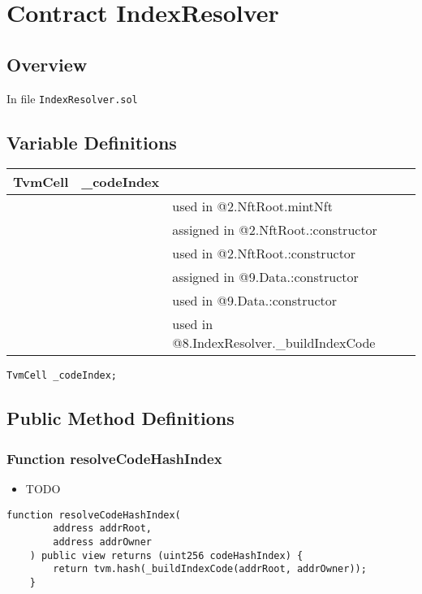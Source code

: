 
\chapter{Contract IndexResolver}

\minitoc

\section{Overview}


In file {\tt IndexResolver.sol}

\section{Variable Definitions}


\ifsoltables
\noindent\begin{tabular}{|l|l|p{5cm}|}\hline
TvmCell & \_{}codeIndex &  \\\hline
 & & used in @2.NftRoot.mintNft\\\hline
 & & assigned in @2.NftRoot.:constructor\\\hline
 & & used in @2.NftRoot.:constructor\\\hline
 & & assigned in @9.Data.:constructor\\\hline
 & & used in @9.Data.:constructor\\\hline
 & & used in @8.IndexResolver.\_{}buildIndexCode\\\hline
\end{tabular}
\fi


\begin{lstlisting}[firstnumber=11]
    TvmCell _codeIndex;
\end{lstlisting}

\section{Public Method Definitions}


\subsection{Function resolveCodeHashIndex}

\begin{itemize}
\item TODO
\end{itemize}

\begin{lstlisting}[firstnumber=13]
    function resolveCodeHashIndex(
        address addrRoot,
        address addrOwner
    ) public view returns (uint256 codeHashIndex) {
        return tvm.hash(_buildIndexCode(addrRoot, addrOwner));
    }
\end{lstlisting}

